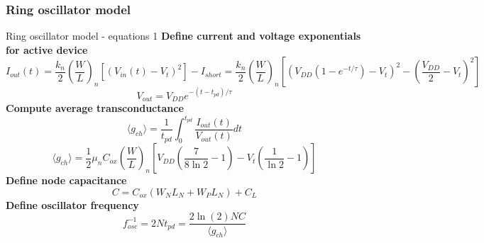 \documentclass[t, screen, aspectratio=43]{beamer}
\begin{document}
\begin{frame}
	\frametitle{Ring oscillator model}
	\begin{block}{Ring oscillator model - equations 1}
	\scriptsize
		\tiny
		\textbf{Define current and voltage exponentials for active device}
		\begin{equation}
			I_{out}(t) = \frac{k_n}{2}\left(\frac{W}{L}\right)_n\left[\left(V_{in}(t) - V_t\right)^2 \right]  - I_{short} = \frac{k_n}{2}\left(\frac{W}{L}\right)_n\left[\left(V_{DD}\left(1-e^{-t/\tau}\right) - V_t\right)^2 - \left(\frac{V_{DD}}{2} -V_t\right)^2\right]
		\end{equation}
		\begin{equation}
			V_{out} = V_{DD}e^{-(t-t_{pd})/\tau}
		\end{equation}
		\tiny
		\textbf{Compute average transconductance}
		\begin{equation}
			\langle g_{ch} \rangle = \frac{1}{t_{pd}} \int_0^{t_{pd}}\frac{I_{out}(t)}{V_{out}(t)}dt
		\end{equation}
		\begin{equation}
			\langle g_{ch} \rangle = \frac{1}{2}\mu_nC_{ox}\left(\frac{W}{L}\right)_n\left[V_{DD}\left(\frac{7}{8\ln2}-1\right)-V_t\left(\frac{1}{\ln2}-1\right) \right]
		\end{equation}
		\textbf{Define node capacitance}
		\begin{equation}
			C = C_{ox}\left ( W_N L_N + W_P L_N \right) + C_L
		\end{equation}
		\textbf{Define oscillator frequency}
		\begin{equation}
			f_{osc}^{-1} = 2Nt_{pd} = \frac{2\ln(2)NC}{\langle g_{ch}\rangle}
		\end{equation}
	\end{block}
\end{frame}
\end{document}
